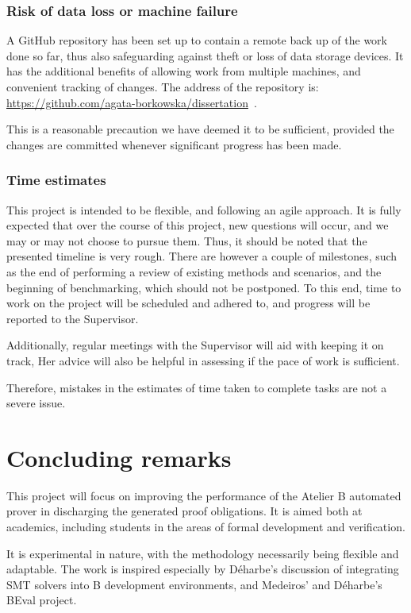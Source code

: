 \documentclass[11pt,journal]{IEEEtran}
\begin{document}
	\subsubsection{Risk of data loss or machine failure}
	A GitHub repository has been set up to contain a remote back up of the work done so far, thus also safeguarding against theft or loss of data storage devices. It has the additional benefits of allowing work from multiple machines, and convenient tracking of changes. The address of the repository is: \url{https://github.com/agata-borkowska/dissertation}~.
	
	This is a reasonable precaution we have deemed it to be sufficient, provided the changes are committed whenever significant progress has been made.
	
	\subsubsection{Time estimates}
	This project is intended to be flexible, and following an agile approach. It is fully expected that over the course of this project, new questions will occur, and we may or may not choose to pursue them. Thus, it should be noted that the presented timeline is very rough. There are however a couple of milestones, such as the end of performing a review of existing methods and scenarios, and the beginning of benchmarking, which should not be postponed. To this end, time to work on the project will be scheduled and adhered to, and progress will be reported to the Supervisor.
	
	Additionally, regular meetings with the Supervisor will aid with keeping it on track, Her advice will also be helpful in assessing if the pace of work is sufficient.
	
	Therefore, mistakes in the estimates of time taken to complete tasks are not a severe issue.
	
	\section{Concluding remarks}
	This project will focus on improving the performance of the Atelier B automated prover in discharging the generated proof obligations. It is aimed both at academics, including students in the areas of formal development and verification.
	
	It is experimental in nature, with the methodology necessarily being flexible and adaptable. The work is inspired especially by D\'{e}harbe's discussion of integrating SMT solvers into B development environments, and Medeiros' and D\'{e}harbe's BEval project.
	
\end{document}
